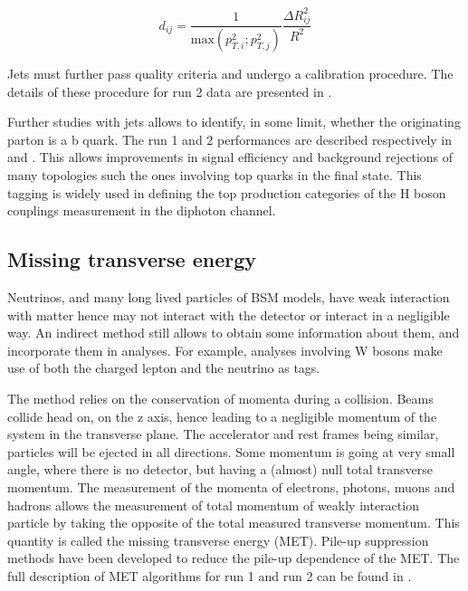 \begin{equation}
\label{eq:org436572d}
d_{ij} = \frac{1}{\text{max}(p_{T,i}^2; p_{T,j}^2)} \frac{\Delta R^2_{ij}}{R^2}
\end{equation}

Jets must further pass quality criteria and undergo a calibration procedure.
The details of these procedure for run 2 data are presented in \cite{ATL-COM-PHYS-2016-213}.

Further studies with jets allows to identify, in some limit, whether the originating parton is a b quark.
The run 1 and 2 performances are described respectively in  \cite{CERN-PH-EP-2015-216} and \cite{ATL-PHYS-PUB-2017-013}.
This allows improvements in signal efficiency and background rejections of many topologies such the ones involving top quarks in the final state.
This tagging is widely used in defining the top production categories of the H boson couplings measurement in the diphoton channel.


\subsection{Missing transverse energy}
\label{sec:org9d53352}
Neutrinos, and many long lived particles of BSM models, have weak interaction with matter hence may not interact with the detector or interact in a negligible way.
An indirect method still allows to obtain some information about them, and incorporate them in analyses.
For example, analyses involving W bosons make use of both the charged lepton and the neutrino as tags.

The method relies on the conservation of momenta during a collision.
Beams collide head on, on the z axis, hence leading to a negligible momentum of the system in the transverse plane.
The accelerator and rest frames being similar, particles will be ejected in all directions.
Some momentum is going at very small angle, where there is no detector, but having a (almost) null total transverse momentum.
The measurement of the momenta of electrons, photons, muons and hadrons allows the measurement of total momentum of weakly interaction particle by taking the opposite of the total measured transverse momentum.
This quantity is called the missing transverse energy (MET).
Pile-up suppression methods have been developed to reduce the pile-up dependence of the MET.
The full description of MET algorithms for run 1 and run 2 can be found in \cite{CERN-PH-EP-2011-114,ATL-PHYS-PUB-2015-023}.
